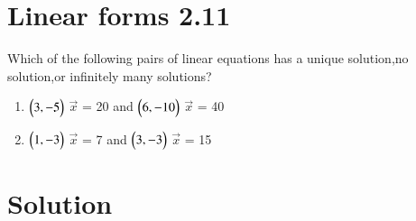 \documentclass[journal,12pt,twocolumn]{IEEEtran}
\begin{document}
\section{Linear forms 2.11}

Which of the following pairs of linear equations has a unique solution,no solution,or infinitely many solutions?
\begin{enumerate}
    \item $\begin{pmatrix}3,-5\end{pmatrix}$ $\vec{x}$ = 20 and $\begin{pmatrix}6,-10\end{pmatrix}$ $\vec{x}$ = 40
    \item $\begin{pmatrix}1,-3\end{pmatrix}$ $\vec{x}$ = 7 and $\begin{pmatrix}3,-3\end{pmatrix}$ $\vec{x}$ = 15
\end{enumerate}
%
%
\section{Solution}
\end{document}
